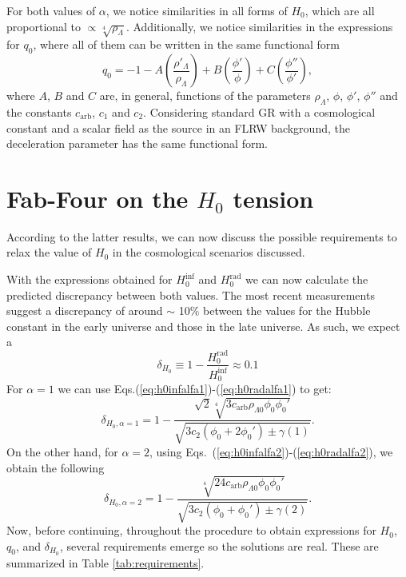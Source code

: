 \documentclass[onecolumn,superscriptaddress,secnumarabic,amssymb,amsmath,nobibnotes,aps,prd,nofootinbib,altaffilletter]{revtex4}
\begin{document}
For both values of $\alpha$, we notice similarities in all forms of $H_0$, which are all proportional to $\propto \sqrt[4]{\rho_\Lambda}$. Additionally, we notice similarities in the expressions for $q_0$, where all of them can be written in the same functional form
\begin{equation}
    q_0 = -1 - A \left(\frac{\rho'_{\Lambda}}{\rho_\Lambda} \right)+ B \left(\frac{\phi'}{\phi} \right)+ C \left(\frac{\phi''}{\phi'}\right),
    \label{eq:q0general}
\end{equation}
where $A$, $B$ and $C$ are, in general, functions of the parameters $\rho_\Lambda$, $\phi$, $\phi'$, $\phi''$ and the constants $c_{\text{arb}}$, $c_1$ and $c_2$. Considering standard GR with a cosmological constant and a scalar field as the source in an FLRW background, the deceleration parameter has the same functional form.




\section{Fab-Four on the $H_0$ tension}
\label{sec:fabfour_tension}

According to the latter results, we can now discuss the possible requirements to relax the value of $H_0$ in the cosmological scenarios discussed.

With the expressions obtained for $H_0^{\text{inf}}$ and $H_0^{\text{rad}}$ we can now calculate the predicted discrepancy between both values. The most recent measurements \cite{Planck_2020, Riess_2022} suggest a discrepancy of around $\sim$ 10\% between the values for the Hubble constant in the early universe and those in the late universe. As such, we expect a
\begin{equation}
    \delta_{H_0} \equiv 1-\frac{H_0^{\text{rad}}}{H_0^{\text{inf}}} \approx 0.1
    \label{eq:deltareal}
\end{equation}
For $\alpha=1$ we can use Eqs.(\ref{eq:h0infalfa1})-(\ref{eq:h0radalfa1}) to get:
\begin{equation}
    \delta_{H_0, \alpha=1} = 1- \frac{\sqrt{2}\sqrt[4]{3c_{\text{arb}}\rho_{\Lambda 0}\phi_0 \phi_0'}}{\sqrt{3c_2(\phi_0 + 2\phi_0')\pm \gamma(1)}}.
    \label{eq:deltaalfa1}
\end{equation}
On the other hand, for $\alpha=2$, using Eqs.~(\ref{eq:h0infalfa2})-(\ref{eq:h0radalfa2}), we obtain the following
\begin{equation}
    \delta_{H_0, \alpha=2} = 1- \frac{\sqrt[4]{24c_{\text{arb}}\rho_{\Lambda 0}\phi_0 \phi_0'}}{\sqrt{3c_2(\phi_0 + \phi_0')\pm \gamma(2)}}
    \label{eq:deltaalfa2}.
\end{equation}
Now, before continuing, throughout the procedure to obtain expressions for $H_0$, $q_0$, and $\delta_{H_0}$, several requirements emerge so the solutions are real. These are summarized in Table \ref{tab:requirements}.
\end{document}

